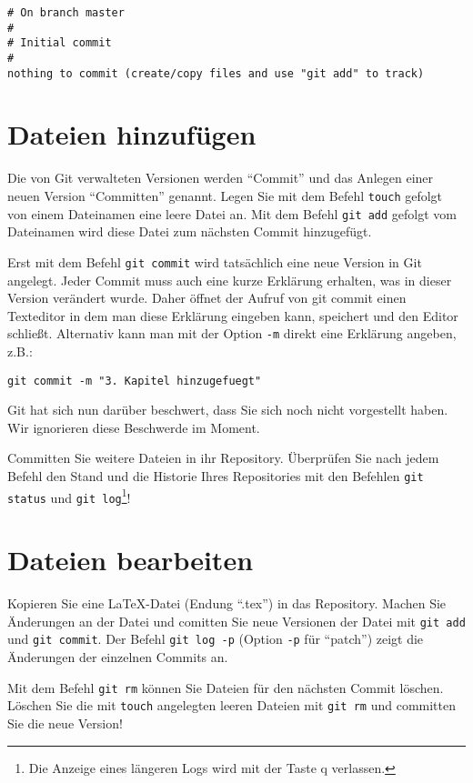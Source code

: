 \documentclass[11pt,a4paper,twoside]{scrartcl}
\begin{document}
\begin{lstlisting}
# On branch master
#
# Initial commit
#
nothing to commit (create/copy files and use "git add" to track)
\end{lstlisting}

\section{Dateien hinzufügen}

Die von Git verwalteten Versionen werden ``Commit'' und das Anlegen einer
neuen Version ``Committen'' genannt. Legen Sie mit dem Befehl
\lstinline{touch} gefolgt von einem Dateinamen eine leere Datei an. Mit dem
Befehl \lstinline{git add} gefolgt vom Dateinamen wird diese Datei zum
nächsten Commit hinzugefügt.

Erst mit dem Befehl \lstinline{git commit} wird tatsächlich eine neue Version
in Git angelegt. Jeder Commit muss auch eine kurze Erklärung erhalten, was in
dieser Version verändert wurde. Daher öffnet der Aufruf von git commit einen
Texteditor in dem man diese Erklärung eingeben kann, speichert und den Editor
schließt. Alternativ kann man mit der Option \lstinline{-m} direkt eine
Erklärung angeben, z.B.:

\begin{lstlisting}
git commit -m "3. Kapitel hinzugefuegt"
\end{lstlisting}

Git hat sich nun darüber beschwert, dass Sie sich noch nicht vorgestellt
haben. Wir ignorieren diese Beschwerde im Moment.

Committen Sie weitere Dateien in ihr Repository. Überprüfen Sie nach jedem
Befehl den Stand und die Historie Ihres Repositories mit den Befehlen
\lstinline{git status} und \lstinline{git log}\footnote{Die Anzeige eines
  längeren Logs wird mit der Taste q verlassen.}!

\section{Dateien bearbeiten}

Kopieren Sie eine \LaTeX-Datei (Endung ``.tex'') in das Repository. Machen Sie
Änderungen an der Datei und comitten Sie neue Versionen der Datei mit
\lstinline{git add} und \lstinline{git commit}. Der Befehl
\lstinline{git log -p} (Option \lstinline{-p} für ``patch'')
zeigt die Änderungen der einzelnen
Commits an.

Mit dem Befehl \lstinline{git rm} können Sie Dateien für den nächsten Commit
löschen. Löschen Sie die mit \lstinline{touch} angelegten leeren Dateien mit
\lstinline{git rm} und committen Sie die neue Version!
\end{document}
